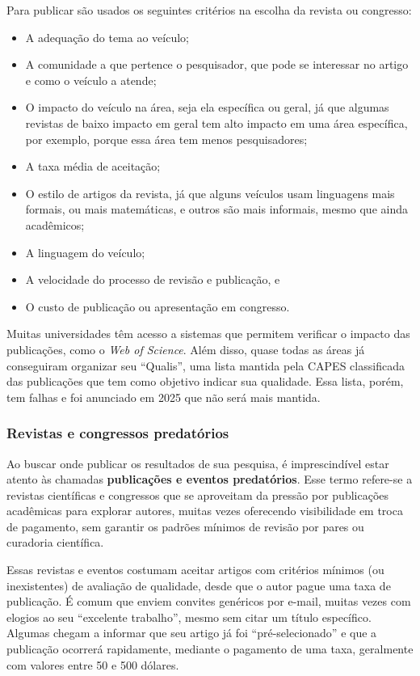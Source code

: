 Para publicar são usados os seguintes critérios na escolha da revista ou congresso:
\begin{itemize}
    \item A adequação do tema ao veículo;
    \item A comunidade a que pertence o pesquisador, que pode se interessar no artigo e como o veículo a atende;
    \item O impacto do veículo na área, seja ela específica ou geral, já que algumas revistas de baixo impacto em geral tem alto impacto em uma área específica, por exemplo, porque essa área tem menos pesquisadores;
    \item A taxa média de aceitação;
    \item O estilo de artigos da revista, já que alguns veículos usam linguagens mais formais, ou mais matemáticas, e outros são mais informais, mesmo que ainda acadêmicos;
    \item A linguagem do veículo;
    \item A velocidade do processo de revisão e publicação, e
    \item O custo de publicação ou apresentação em congresso.
\end{itemize}


Muitas universidades têm acesso a sistemas que permitem verificar o impacto das publicações, como o \textit{Web of Science}. Além disso, quase todas as áreas já conseguiram organizar seu ``Qualis'', uma lista mantida pela CAPES classificada das publicações que tem como objetivo indicar sua qualidade. Essa lista, porém, tem falhas e foi anunciado em 2025 que não será mais mantida.


\subsubsection{Revistas e congressos predatórios}

Ao buscar onde publicar os resultados de sua pesquisa, é imprescindível estar atento às chamadas \textbf{publicações e eventos predatórios}.
Esse termo refere-se a revistas científicas e congressos que se aproveitam da pressão por publicações acadêmicas para explorar autores, muitas vezes oferecendo visibilidade em troca de pagamento, sem garantir os padrões mínimos de revisão por pares ou curadoria científica.

 Essas revistas e eventos costumam aceitar artigos com critérios mínimos (ou inexistentes) de avaliação de qualidade, desde que o autor pague uma taxa de publicação. 
 É comum que enviem convites genéricos por e-mail, muitas vezes com elogios ao seu ``excelente trabalho'', mesmo sem citar um título específico. 
 Algumas chegam a informar que seu artigo já foi ``pré-selecionado'' e que a publicação ocorrerá rapidamente, mediante o pagamento de uma taxa, geralmente com valores entre 50 e 500 dólares.

